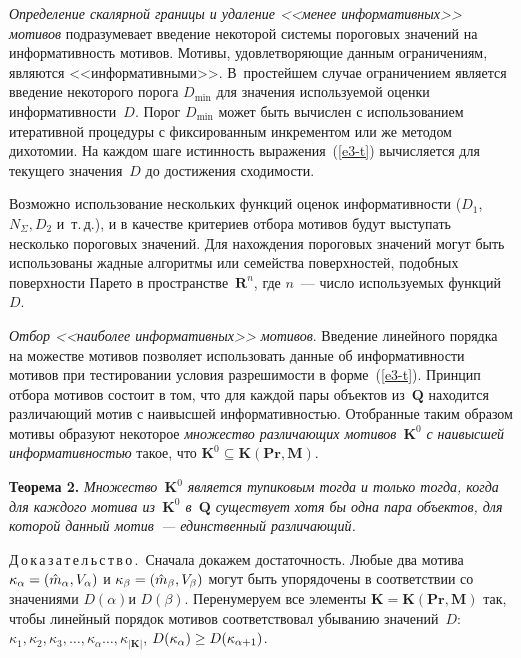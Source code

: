 \begin{multicols}{2}
\textit{Определение скалярной границы и удаление <<менее
информативных>> мотивов} подразумевает введение некоторой системы
пороговых значений на информативность мотивов. Мотивы,
удовлетворяющие данным ограничениям, являются <<информативными>>.
В~простейшем случае ограничением является введение некоторого порога
$D_{\min}$ для значения используемой оценки информативности~$D$.
Порог $D_{\min}$ может быть вычислен с использованием итеративной процедуры с
фиксированным инкрементом или же методом дихотомии. На каждом шаге
истинность выражения~(\ref{e3-t}) вычисляется для текущего значения~$D$
до достижения сходимости.

Возможно использование нескольких функций оценок информативности
($D_1$, $N_\Sigma, D_2$ и~т.\,д.), и в качестве критериев отбора мотивов
будут выступать несколько пороговых значений. Для нахождения пороговых
значений могут быть использованы жадные алгоритмы или семейства
поверхностей, подобных поверхности Парето в
пространстве~$\mathbf{R}^n$, где $n$~--- число используемых
функций~$D$.

\textit{Отбор <<наиболее информативных>> мотивов}.
Введение линейного порядка на можестве мотивов позволяет использовать
данные об информативности мотивов при тестировании условия
разрешимости в форме~(\ref{e3-t}). Принцип отбора мотивов состоит в том,
что для каждой пары объектов из~$\mathbf{Q}$ находится различающий мотив с
наивысшей информативностью. Отобранные таким образом мотивы
образуют некоторое \textit{множество различающих мотивов}~$\mathbf{K}^0$
\textit{с наивысшей информативностью} такое, что
$\mathbf{K}^0\subseteq \mathbf{K}(\mathbf{Pr}, \mathbf{M})$.

\medskip

\noindent
\textbf{Теорема 2.} \textit{Множество~$\mathbf{K}^0$ является тупиковым тогда и
только тогда, когда для каждого мотива из~$\mathbf{K}^0$ в~$\mathbf{Q}$ существует хотя
бы одна пара объектов, для которой данный мотив~--- единственный
различающий.}

\medskip

\noindent
Д\,о\,к\,а\,з\,а\,т\,е\,л\,ь\,с\,т\,в\,о\,.\ Сначала докажем достаточность. Любые
два мотива $\kappa_\alpha\hm= (\hat{m}_\alpha,V_\alpha)$ и
$\kappa_\beta\hm=(\hat{m}_\beta,V_\beta)$ могут быть упорядочены в
соответствии со значениями $D(\alpha)$и $D(\beta)$. Перенумеруем все
элементы $\mathbf{K} = \mathbf{K}(\mathbf{Pr}, \mathbf{M})$ так, чтобы линейный порядок мотивов
соответствовал убыванию значений~$D$: $\kappa_1, \kappa_2, \kappa_3, \ldots
, \kappa_\alpha\ldots , \kappa_{\vert \mathbf{K}\vert}$, $D(\kappa_\alpha) \hm\geq
D(\kappa_{\alpha+1})$.


\end{multicols}
